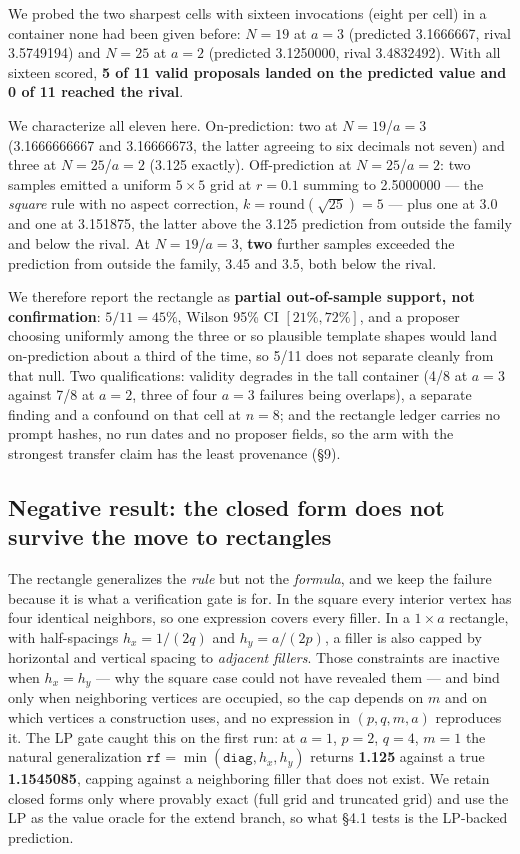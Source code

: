 We probed the two sharpest cells with sixteen invocations (eight per cell) in a container none had been given
before: $N = 19$ at $a = 3$ (predicted 3.1666667, rival 3.5749194) and $N = 25$ at $a = 2$ (predicted
3.1250000, rival 3.4832492). With all sixteen scored, \textbf{5 of 11 valid proposals landed on the
predicted value and 0 of 11 reached the rival}.

We characterize all eleven here. On-prediction: two
at $N = 19$/$a = 3$ (3.1666666667 and 3.16666673, the latter agreeing to six decimals not seven) and
three at $N = 25$/$a = 2$ (3.125 exactly). Off-prediction at $N = 25$/$a = 2$: two samples emitted a
uniform $5 \times 5$ grid at $r = 0.1$ summing to 2.5000000 --- the \emph{square} rule with no aspect correction,
$k = \mathrm{round}(\sqrt{25}) = 5$ --- plus one at 3.0 and one at 3.151875, the latter above the 3.125 prediction from outside the family and below the rival. At $N = 19$/$a = 3$, \textbf{two} further samples
exceeded the prediction from outside the family, 3.45 and 3.5, both below the rival.

We therefore report the rectangle as \textbf{partial out-of-sample support, not confirmation}:
$5/11 = 45\%$, Wilson 95\% CI $[21\%, 72\%]$, and a proposer choosing uniformly among the three or so
plausible template shapes would land on-prediction about a third of the time, so 5/11 does not
separate cleanly from that null. Two qualifications: validity degrades in the tall container
(4/8 at $a = 3$ against 7/8 at $a = 2$, three of four $a = 3$ failures being overlaps), a separate
finding and a confound on that cell at $n = 8$; and the rectangle ledger carries no prompt hashes,
no run dates and no proposer fields, so the arm with the strongest transfer claim has the least
provenance (\S9).

\subsection{Negative result: the closed form does not survive the move to rectangles}

The rectangle generalizes the \emph{rule} but not the \emph{formula}, and we keep the failure because it
is what a verification gate is for. In the square every interior vertex has four identical
neighbors, so one expression covers every filler. In a $1 \times a$ rectangle, with half-spacings
$h_x = 1/(2q)$ and $h_y = a/(2p)$, a filler is also capped by horizontal and vertical spacing to
\emph{adjacent fillers}. Those constraints are inactive when $h_x = h_y$ --- why the square case could not
have revealed them --- and bind only when neighboring vertices are occupied, so the cap depends
on $m$ and on which vertices a construction uses, and no expression in $(p, q, m, a)$ reproduces
it. The LP gate caught this on the first run: at $a = 1$, $p = 2$, $q = 4$, $m = 1$ the natural
generalization $\texttt{rf} = \min(\texttt{diag}, h_x, h_y)$ returns \textbf{1.125} against a true \textbf{1.1545085}, capping
against a neighboring filler that does not exist. We retain closed forms only where provably
exact (full grid and truncated grid) and use the LP as the value oracle for the extend branch,
so what \S4.1 tests is the LP-backed prediction.

